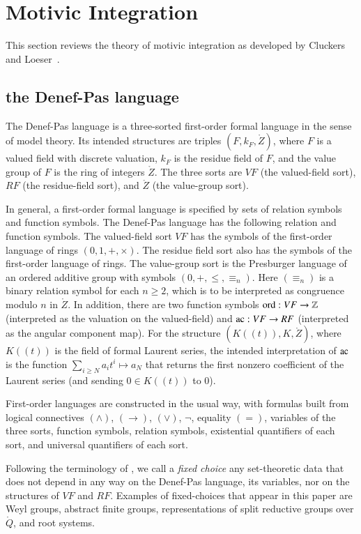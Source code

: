 \section{Motivic Integration}

This section reviews the theory of motivic integration as developed by
Cluckers and Loeser~\cite{cluckers2008constructible}.

\subsection{the Denef-Pas language}

The Denef-Pas language is a three-sorted first-order formal language
in the sense of model theory.  Its intended structures are triples
$(F,k_F,\ring{Z})$, where $F$ is a valued field with discrete
valuation, $k_F$ is the residue field of $F$, and the value group of
$F$ is the ring of integers $\ring{Z}$.  The three sorts are $VF$
(the valued-field sort), $RF$ (the residue-field sort), and $\ring{Z}$
(the value-group sort).

In general, a first-order formal language is specified by sets of
relation symbols and function symbols.  The Denef-Pas language has the
following relation and function symbols.  The valued-field sort $VF$
has the symbols of the first-order language of rings $(0,1,+,\times)$.
The residue field sort also has the symbols of the first-order
language of rings.  The value-group sort is the Presburger language of
an ordered additive group with symbols $(0,+,\le,\equiv_n)$.  Here
$(\equiv_n)$ is a binary relation symbol for each $n\ge 2$, which is
to be interpreted as congruence modulo $n$ in $\ring{Z}$.  In
addition, there are two function symbols ${\operatorname{ord}}:VF\to\mathbb{Z}$
(interpreted as the valuation on the valued-field) and ${\operatorname{ac}}:VF\to
RF$ (interpreted as the angular component map).  For the structure
$(K((t)),K,\ring{Z})$, where $K((t))$ is the field of formal Laurent
series, the intended interpretation of ${\operatorname{ac}}$ is the function
$\sum_{i\ge N} a_i t^i\mapsto a_N$ that returns the first nonzero
coefficient of the Laurent series (and sending $0\in K((t))$ to $0$).

First-order languages are constructed in the usual way, with formulas
built from logical connectives $(\land)$, $(\to)$, $(\lor)$, $\neg$,
equality $(=)$, variables of the three sorts, function symbols,
relation symbols, existential quantifiers of each sort, and universal
quantifiers of each sort.

Following the terminology of \cite{gordon}, we call a {\it fixed
  choice} any set-theoretic data that does not depend in any way on
the Denef-Pas language, its variables, nor on the structures of $VF$
and $RF$.  Examples of fixed-choices that appear in this paper are
Weyl groups, abstract finite groups, representations of split reductive
groups over $\ring{Q}$, and root systems.

